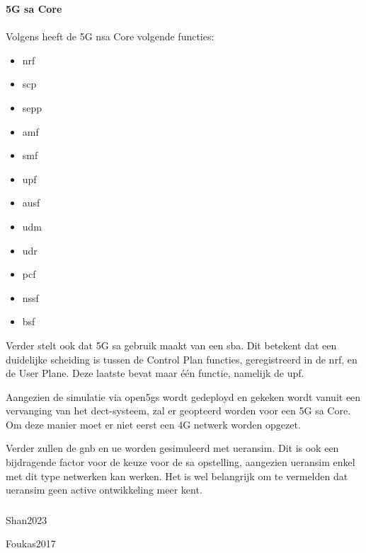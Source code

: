 \textbf{5G \gls{sa} Core}\\\\

Volgens \textcite{Lee2025a} heeft de 5G \gls{nsa} Core volgende functies:

\begin{itemize}
  \item \gls{nrf}
  \item \gls{scp}
  \item \gls{sepp}
  \item \gls{amf}
  \item \gls{smf}
  \item \gls{upf}
  \item \gls{ausf}
  \item \gls{udm}
  \item \gls{udr}
  \item \gls{pcf}
  \item \gls{nssf}
  \item \gls{bsf}
\end{itemize}

Verder stelt \textcite{Lee2025a} ook dat 5G \gls{sa} gebruik maakt van een \gls{sba}. Dit betekent dat een duidelijke scheiding is tussen de Control Plan functies, geregistreerd in de \gls{nrf}, en de User Plane. Deze laatste bevat maar \'e\'en functie, namelijk de \gls{upf}.

Aangezien de simulatie via \gls{open5gs} wordt gedeployd en gekeken wordt vanuit een vervanging van het \gls{dect}-systeem, zal er geopteerd worden voor een 5G \gls{sa} Core. Om deze manier moet er niet eerst een 4G netwerk worden opgezet.

Verder zullen de \gls{gnb} en \gls{ue} worden gesimuleerd met \gls{ueransim}. Dit is ook een bijdragende factor voor de keuze voor de \gls{sa} opstelling, aangezien \gls{ueransim} enkel met dit type netwerken kan werken. Het is wel belangrijk om te vermelden dat \gls{ueransim} geen active ontwikkeling meer kent.

\subsubsection{}
\label{sec:Slicing}


Shan2023

Foukas2017

\subsubsection{}
\label{sec:Cost}

